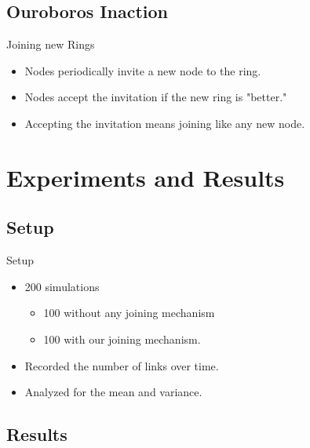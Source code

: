 \documentclass{beamer}
\begin{document}
\subsection{Ouroboros Inaction}

\begin{frame}{Joining new Rings}
	\begin{itemize}
		\item Nodes periodically invite a new node to the ring.
		\item Nodes accept the invitation if the new ring is "better."
		\item Accepting the invitation means joining like any new node.
	\end{itemize}
\end{frame}



\section{Experiments and Results}

\subsection{Setup}

\begin{frame}{Setup}
	\begin{itemize}
		\item 200 simulations
		\begin{itemize}
			\item 100 without any joining mechanism
			\item 100 with our joining mechanism.
		\end{itemize}
		\item Recorded the number of links over time.
		\item Analyzed for the mean and variance.
	\end{itemize}
\end{frame}



\subsection{Results}
\end{document}
